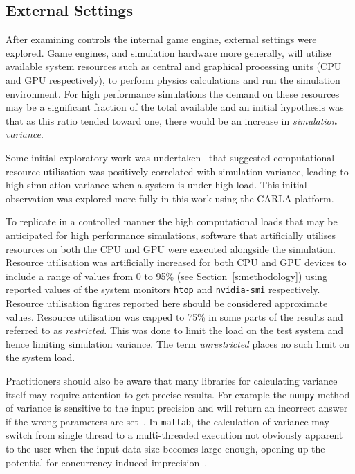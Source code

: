 \subsection{External Settings}

After examining controls the internal game engine, external settings were explored. Game engines, and simulation hardware more generally, will utilise available system resources such as central and graphical processing units (CPU and GPU respectively), to perform physics calculations and run the simulation environment. For high performance simulations the demand on these resources may be a significant fraction of the total available and an initial hypothesis was that as this ratio tended toward one, there would be an increase in \textit{simulation variance}.

Some initial exploratory work was undertaken~\cite{TSLUnrealEngineTesting} that suggested computational resource utilisation was positively correlated with simulation variance, leading to high simulation variance when a system is under high load. This initial observation was explored more fully in this work using the CARLA platform. 

To replicate in a controlled manner the high computational loads that may be anticipated for high performance simulations, software that artificially utilises resources on both the CPU and GPU were executed alongside the simulation. Resource utilisation was artificially increased for both CPU and GPU devices to include a range of values from 0 to 95\% (see Section~\ref{s:methodology}) using reported values of the system monitors \texttt{htop} and \texttt{nvidia-smi} respectively. Resource utilisation figures reported here should be considered approximate values. Resource utilisation was capped to 75\% in some parts of the results and referred to as \textit{restricted}. This was done to limit the load on the test system and hence limiting simulation variance. The term \textit{unrestricted} places no such limit on the system load.

Practitioners should also be aware that many libraries for calculating variance itself may require attention to get precise results. For example the \texttt{numpy} method of variance is sensitive to the input precision and will return an incorrect answer if the wrong parameters are set~\cite{NumpyVar}. In \texttt{matlab}, the calculation of variance may switch from single thread to a multi-threaded execution not obviously apparent to the user when the input data size becomes large enough, opening up the potential for concurrency-induced imprecision~\cite{matlab_parallel_computing}. 


